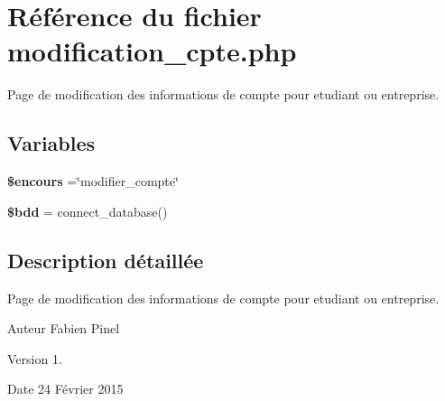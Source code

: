 \hypertarget{modification__cpte_8php}{\section{Référence du fichier modification\-\_\-cpte.\-php}
\label{modification__cpte_8php}
}


Page de modification des informations de compte pour etudiant ou entreprise.  


\subsection*{Variables}
\begin{DoxyCompactItemize}
\item 
\hypertarget{modification__cpte_8php_af7b0e56292699e6983c24fbbf70ce08d}{{\bfseries \$encours} =\char`\"{}modifier\-\_\-compte\char`\"{}}\label{modification__cpte_8php_af7b0e56292699e6983c24fbbf70ce08d}

\item 
\hypertarget{modification__cpte_8php_a94f91e878bce0991e2cd595c5dd79b3f}{{\bfseries \$bdd} = connect\-\_\-database()}\label{modification__cpte_8php_a94f91e878bce0991e2cd595c5dd79b3f}

\end{DoxyCompactItemize}


\subsection{Description détaillée}
Page de modification des informations de compte pour etudiant ou entreprise. \begin{DoxyAuthor}{Auteur}
Fabien Pinel 
\end{DoxyAuthor}
\begin{DoxyVersion}{Version}
1. 
\end{DoxyVersion}
\begin{DoxyDate}{Date}
24 Février 2015 
\end{DoxyDate}
